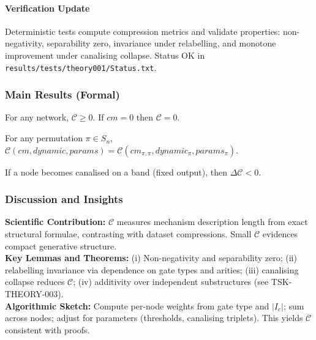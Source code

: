 \documentclass{article}
\begin{document}
\paragraph{Verification Update} Deterministic tests compute compression metrics and validate properties: non-negativity, separability zero, invariance under relabelling, and monotone improvement under canalising collapse. Status OK in \texttt{results/tests/theory001/Status.txt}.
\subsubsection*{Main Results (Formal)}
\begin{lemma}
For any network, \(\mathcal{C}\ge 0\). If \(cm=0\) then \(\mathcal{C}=0\).
\end{lemma}
\begin{lemma}
For any permutation \(\pi\in S_n\), \(\mathcal{C}(cm, dynamic, params)=\mathcal{C}(cm_{\pi,\pi}, dynamic_{\pi}, params_{\pi})\).
\end{lemma}
\begin{theorem}
If a node becomes canalised on a band (fixed output), then \(\Delta \mathcal{C}<0\).
\end{theorem}
\subsubsection*{Discussion and Insights}
\textbf{Scientific Contribution:} \(\mathcal{C}\) measures mechanism description length from exact structural formulae, contrasting with dataset compressions. Small \(\mathcal{C}\) evidences compact generative structure.\\
\textbf{Key Lemmas and Theorems:} (i) Non-negativity and separability zero; (ii) relabelling invariance via dependence on gate types and arities; (iii) canalising collapse reduces \(\mathcal{C}\); (iv) additivity over independent substructures (see TSK-\,THEORY-003).\\
\textbf{Algorithmic Sketch:} Compute per-node weights from gate type and \(\lvert I_c\rvert\); sum across nodes; adjust for parameters (thresholds, canalising triplets). This yields \(\mathcal{C}\) consistent with proofs.
\end{document}
